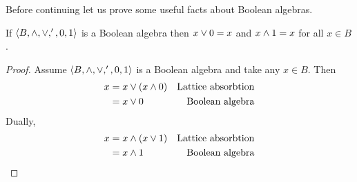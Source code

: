 Before continuing let us prove some useful facts about Boolean algebras.
\begin{theorem*}
If $\langle B, \wedge, \vee, ', 0 , 1\rangle$ is a Boolean algebra then $x \vee 0 = x$ and $x \wedge 1 = x$ for all $x\in B$.
\end{theorem*}

\begin{proof}
Assume  $\langle B, \wedge, \vee, ', 0 , 1\rangle$ is a Boolean algebra and take any $x \in B$.
Then
\begin{align*}
  x &= x \vee (x \wedge 0)           & \text{Lattice absorbtion}\\
    &= x \vee 0                     & \text{Boolean algebra}
\end{align*}
Dually,
\begin{align*}
  x &= x \wedge (x \vee 1)           & \text{Lattice absorbtion}\\
    &= x \wedge 1                     & \text{Boolean algebra}
\end{align*}
\end{proof}

